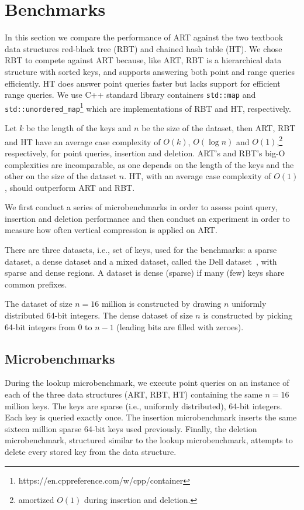 \documentclass[abstracton,12pt]{scrartcl}
\theoremstyle{definition}
\begin{document}
\newpage

\section{Benchmarks}\label{sec:benchmarks}

In this section we compare the performance of ART against the two textbook
data structures red-black tree (RBT) and chained hash table (HT).
We chose RBT to compete against ART because, like ART, RBT is a hierarchical
data structure with sorted keys, and supports answering both point and range
queries efficiently. HT does answer point queries faster but lacks support for
efficient range queries. We use C++ standard library containers 
\texttt{std::map} and \texttt{std::unordered\_map}\footnote{https://en.cppreference.com/w/cpp/container}
which are implementations of RBT and HT, respectively.

Let $k$ be the length of the keys and $n$ be the size of the dataset, then
ART, RBT and HT have an average case complexity of $O(k)$, 
$O(\log{}n)$ and $O(1)$,\footnote{amortized
$O(1)$ during insertion and deletion.} respectively, 
for point queries, insertion and deletion. ART's and RBT's big-O complexities are
incomparable, as one depends on the length of the keys and the other on the 
size of the dataset $n$. HT, with an average case 
complexity of $O(1)$, should outperform ART and RBT.

We first conduct a series of microbenchmarks in order to assess point query,
insertion and deletion performance and then conduct an experiment in order
to measure how often vertical compression is applied on ART. 

There are three datasets, i.e., set of keys, used for the benchmarks: a sparse
dataset, a dense dataset and a mixed dataset, called the Dell
dataset~\cite{wellenzohn2017wapi}, with sparse and dense regions. 
A dataset is dense (sparse) if many (few) keys share common prefixes. 

The dataset of size $n = 16$ million is constructed by drawing $n$ uniformly 
distributed 64-bit integers. The dense dataset of size $n$ is constructed 
by picking 64-bit integers from $0$ to $n - 1$ (leading bits are filled with 
zeroes).

\subsection{Microbenchmarks}\label{sec:microbenchmarks}

During the lookup microbenchmark, we execute point queries on an instance
of each of the three data structures (ART, RBT, HT)
containing the same $n=16$ million keys. The keys are sparse (i.e., uniformly
distributed), 64-bit integers. Each key is queried exactly once.
The insertion microbenchmark inserts the same sixteen million sparse 64-bit keys
used previously. Finally, the deletion microbenchmark, structured similar to 
the lookup microbenchmark, attempts to delete every stored key from the data 
structure.
\end{document}
